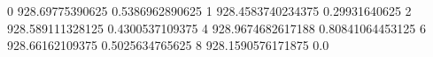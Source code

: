 0 928.69775390625 0.5386962890625
1 928.4583740234375 0.29931640625
2 928.589111328125 0.4300537109375
4 928.9674682617188 0.80841064453125
6 928.66162109375 0.5025634765625
8 928.1590576171875 0.0
